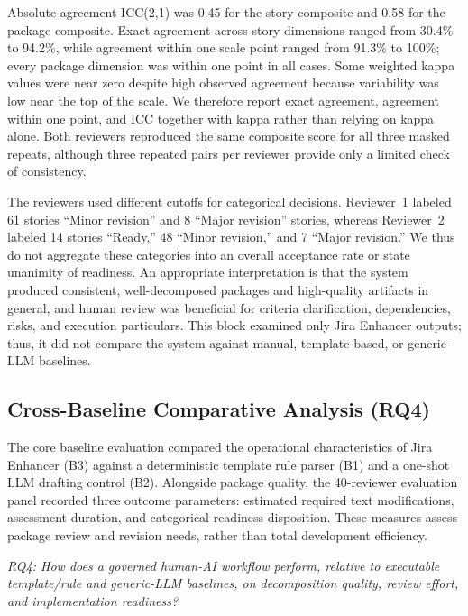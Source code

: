 \documentclass[manuscript,review]{acmart}
\begin{document}
Absolute-agreement ICC(2,1) was 0.45 for the story composite and 0.58 for the package composite. Exact agreement across story dimensions ranged from 30.4\% to 94.2\%, while agreement within one scale point ranged from 91.3\% to 100\%; every package dimension was within one point in all cases. Some weighted kappa values were near zero despite high observed agreement because variability was low near the top of the scale. We therefore report exact agreement, agreement within one point, and ICC together with kappa rather than relying on kappa alone. Both reviewers reproduced the same composite score for all three masked repeats, although three repeated pairs per reviewer provide only a limited check of consistency.

The reviewers used different cutoffs for categorical decisions. Reviewer~1 labeled 61 stories ``Minor revision'' and 8 ``Major revision'' stories, whereas Reviewer~2 labeled 14 stories ``Ready,'' 48 ``Minor revision,'' and 7 ``Major revision.'' We thus do not aggregate these categories into an overall acceptance rate or state unanimity of readiness. An appropriate interpretation is that the system produced consistent, well-decomposed packages and high-quality artifacts in general, and human review was beneficial for criteria clarification, dependencies, risks, and execution particulars. This block examined only Jira Enhancer outputs; thus, it did not compare the system against manual, template-based, or generic-LLM baselines.

\subsection{Cross-Baseline Comparative Analysis (RQ4)}\label{sec:matched-comparison}
The core baseline evaluation compared the operational characteristics of Jira Enhancer (B3) against a deterministic template rule parser (B1) and a one-shot LLM drafting control (B2). Alongside package quality, the 40-reviewer evaluation panel recorded three outcome parameters: estimated required text modifications, assessment duration, and categorical readiness disposition. These measures assess package review and revision needs, rather than total development efficiency.


\noindent\textit{RQ4: How does a governed human-AI workflow perform, relative to executable template/rule and generic-LLM baselines, on decomposition quality, review effort, and implementation readiness?}\par
\end{document}
